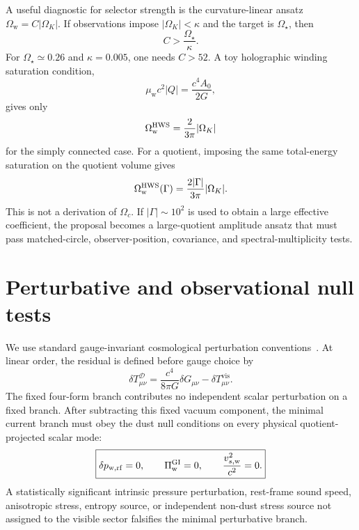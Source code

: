 \documentclass[
  aps,
  prd,
  reprint,
  superscriptaddress,
  floatfix,
  nofootinbib,
  longbibliography
]{revtex4-2}
\theoremstyle{plain}
\theoremstyle{definition}
\theoremstyle{remark}
\newcommand{\D}{\mathcal D}
\newcommand{\vis}{\mathrm{vis}}
\newcommand{\wind}{\mathrm w}
\newcommand{\GI}{\mathrm{GI}}
\newcommand{\Ow}{\Omega_{\mathrm w}}
\begin{document}
A useful diagnostic for selector strength is the curvature-linear ansatz
\(\Ow=C|\Omega_K|\).  If observations impose \(|\Omega_K|<\kappa\) and the
target is \(\Omega_\star\), then
\begin{equation}
C>\frac{\Omega_\star}{\kappa} .
\label{eq:selector_bound_v5}
\end{equation}
For \(\Omega_\star\simeq0.26\) and \(\kappa=0.005\), one needs \(C>52\).
A toy holographic winding saturation condition,
\begin{equation}
\mu_{\wind}c^2|Q|=\frac{c^4A_0}{2G},
\end{equation}
gives only
\begin{equation}
\Ow^{\rm HWS}=\frac{2}{3\pi}|\Omega_K|
\label{eq:hws_simple_v5}
\end{equation}
for the simply connected case.  For a quotient, imposing the same total-energy
saturation on the quotient volume gives
\begin{equation}
\Ow^{\rm HWS}(\Gamma)=\frac{2|\Gamma|}{3\pi}|\Omega_K| .
\label{eq:hws_quotient_v5}
\end{equation}
This is not a derivation of \(\Omega_c\).  If \(|\Gamma|\sim 10^2\) is used to
obtain a large effective coefficient, the proposal becomes a large-quotient
amplitude ansatz that must pass matched-circle, observer-position, covariance,
and spectral-multiplicity tests.

\section{Perturbative and observational null tests}

We use standard gauge-invariant cosmological perturbation conventions~\cite{Bardeen,KodamaSasaki,Mukhanov,MaBertschinger}.  At linear order, the residual is defined before gauge choice by
\begin{equation}
\delta T^\D_{\mu\nu}=\frac{c^4}{8\pi G}\delta G_{\mu\nu}
-\delta T^{\vis}_{\mu\nu} .
\label{eq:linear_residual_v5}
\end{equation}
The fixed four-form branch contributes no independent scalar perturbation on a
fixed branch.  After subtracting this fixed vacuum component, the minimal
current branch must obey the dust null conditions on every physical
quotient-projected scalar mode:
\begin{equation}
\boxed{
\delta p_{\wind,{\rm rf}}=0,
\qquad
\Pi_{\wind}^{\GI}=0,
\qquad
\frac{v_{s,\wind}^2}{c^2}=0 .
}
\label{eq:dust_null_conditions_v5}
\end{equation}
A statistically significant intrinsic pressure perturbation, rest-frame sound
speed, anisotropic stress, entropy source, or independent non-dust stress source
not assigned to the visible sector falsifies the minimal perturbative branch.
\end{document}
